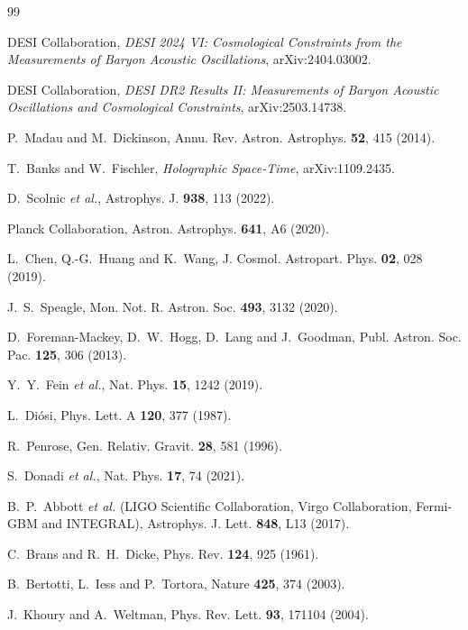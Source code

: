 \documentclass[aps,prd,twocolumn,superscriptaddress,nofootinbib,floatfix]{revtex4-2}
\begin{document}
\begin{thebibliography}{99}

 DESI Collaboration, \emph{DESI 2024 VI:
Cosmological Constraints from the Measurements of Baryon Acoustic
Oscillations}, arXiv:2404.03002.

 DESI Collaboration, \emph{DESI DR2 Results II:
Measurements of Baryon Acoustic Oscillations and Cosmological
Constraints}, arXiv:2503.14738.

 P.~Madau and M.~Dickinson,
Annu. Rev. Astron. Astrophys. \textbf{52}, 415 (2014).

 T.~Banks and W.~Fischler,
\emph{Holographic Space-Time}, arXiv:1109.2435.

 D.~Scolnic \emph{et al.},
Astrophys. J. \textbf{938}, 113 (2022).

 Planck Collaboration,
Astron. Astrophys. \textbf{641}, A6 (2020).

 L.~Chen, Q.-G.~Huang and K.~Wang,
J. Cosmol. Astropart. Phys. \textbf{02}, 028 (2019).

 J.~S.~Speagle,
Mon. Not. R. Astron. Soc. \textbf{493}, 3132 (2020).

 D.~Foreman-Mackey, D.~W.~Hogg, D.~Lang and J.~Goodman,
Publ. Astron. Soc. Pac. \textbf{125}, 306 (2013).

 Y.~Y.~Fein \emph{et al.},
Nat. Phys. \textbf{15}, 1242 (2019).

 L.~Di\'osi, Phys. Lett. A \textbf{120}, 377 (1987).

 R.~Penrose,
Gen. Relativ. Gravit. \textbf{28}, 581 (1996).

 S.~Donadi \emph{et al.},
Nat. Phys. \textbf{17}, 74 (2021).

 B.~P.~Abbott \emph{et al.} (LIGO Scientific
Collaboration, Virgo Collaboration, Fermi-GBM and INTEGRAL),
Astrophys. J. Lett. \textbf{848}, L13 (2017).

 C.~Brans and R.~H.~Dicke,
Phys. Rev. \textbf{124}, 925 (1961).

 B.~Bertotti, L.~Iess and P.~Tortora,
Nature \textbf{425}, 374 (2003).

 J.~Khoury and A.~Weltman,
Phys. Rev. Lett. \textbf{93}, 171104 (2004).


\end{thebibliography}
\end{document}
